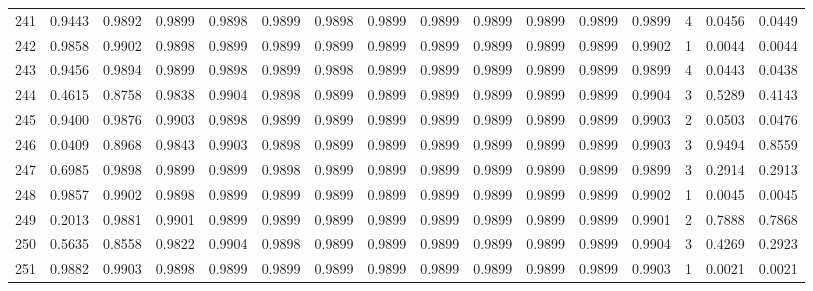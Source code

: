 \begin{tabular}{lrrrrrrrrrrrrrrr}
241 &      0.9443 &  0.9892 &  0.9899 &  0.9898 &  0.9899 &  0.9898 &  0.9899 &  0.9899 &  0.9899 &  0.9899 &   0.9899 &     0.9899 &      4 &                    0.0456 &                     0.0449 \\
242 &      0.9858 &  0.9902 &  0.9898 &  0.9899 &  0.9899 &  0.9899 &  0.9899 &  0.9899 &  0.9899 &  0.9899 &   0.9899 &     0.9902 &      1 &                    0.0044 &                     0.0044 \\
243 &      0.9456 &  0.9894 &  0.9899 &  0.9898 &  0.9899 &  0.9898 &  0.9899 &  0.9899 &  0.9899 &  0.9899 &   0.9899 &     0.9899 &      4 &                    0.0443 &                     0.0438 \\
244 &      0.4615 &  0.8758 &  0.9838 &  0.9904 &  0.9898 &  0.9899 &  0.9899 &  0.9899 &  0.9899 &  0.9899 &   0.9899 &     0.9904 &      3 &                    0.5289 &                     0.4143 \\
245 &      0.9400 &  0.9876 &  0.9903 &  0.9898 &  0.9899 &  0.9899 &  0.9899 &  0.9899 &  0.9899 &  0.9899 &   0.9899 &     0.9903 &      2 &                    0.0503 &                     0.0476 \\
246 &      0.0409 &  0.8968 &  0.9843 &  0.9903 &  0.9898 &  0.9899 &  0.9899 &  0.9899 &  0.9899 &  0.9899 &   0.9899 &     0.9903 &      3 &                    0.9494 &                     0.8559 \\
247 &      0.6985 &  0.9898 &  0.9899 &  0.9899 &  0.9898 &  0.9899 &  0.9899 &  0.9899 &  0.9899 &  0.9899 &   0.9899 &     0.9899 &      3 &                    0.2914 &                     0.2913 \\
248 &      0.9857 &  0.9902 &  0.9898 &  0.9899 &  0.9899 &  0.9899 &  0.9899 &  0.9899 &  0.9899 &  0.9899 &   0.9899 &     0.9902 &      1 &                    0.0045 &                     0.0045 \\
249 &      0.2013 &  0.9881 &  0.9901 &  0.9899 &  0.9899 &  0.9899 &  0.9899 &  0.9899 &  0.9899 &  0.9899 &   0.9899 &     0.9901 &      2 &                    0.7888 &                     0.7868 \\
250 &      0.5635 &  0.8558 &  0.9822 &  0.9904 &  0.9898 &  0.9899 &  0.9899 &  0.9899 &  0.9899 &  0.9899 &   0.9899 &     0.9904 &      3 &                    0.4269 &                     0.2923 \\
251 &      0.9882 &  0.9903 &  0.9898 &  0.9899 &  0.9899 &  0.9899 &  0.9899 &  0.9899 &  0.9899 &  0.9899 &   0.9899 &     0.9903 &      1 &                    0.0021 &                     0.0021 \\

\end{tabular}
